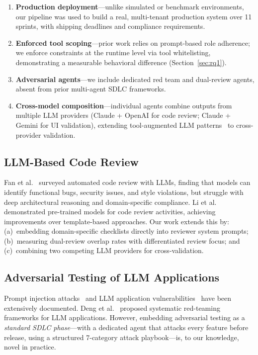 \documentclass[11pt,a4paper]{article}
\begin{document}
\begin{enumerate}
    \item \textbf{Production deployment}---unlike simulated or benchmark environments, our pipeline was used to build a real, multi-tenant production system over 11 sprints, with shipping deadlines and compliance requirements.
    \item \textbf{Enforced tool scoping}---prior work relies on prompt-based role adherence; we enforce constraints at the runtime level via tool whitelisting, demonstrating a measurable behavioral difference (Section~\ref{sec:rq1}).
    \item \textbf{Adversarial agents}---we include dedicated red team and dual-review agents, absent from prior multi-agent SDLC frameworks.
    \item \textbf{Cross-model composition}---individual agents combine outputs from multiple LLM providers (Claude + OpenAI for code review; Claude + Gemini for UI validation), extending tool-augmented LLM patterns~\cite{schick2023} to cross-provider validation.
\end{enumerate}

\subsection{LLM-Based Code Review}

Fan et al.~\cite{lu2023} surveyed automated code review with LLMs, finding that models can identify functional bugs, security issues, and style violations, but struggle with deep architectural reasoning and domain-specific compliance. Li et al.~\cite{li2022} demonstrated pre-trained models for code review activities, achieving improvements over template-based approaches. Our work extends this by: (a)~embedding domain-specific checklists directly into reviewer system prompts; (b)~measuring dual-review overlap rates with differentiated review focus; and (c)~combining two competing LLM providers for cross-validation.

\subsection{Adversarial Testing of LLM Applications}

Prompt injection attacks~\cite{perez2022, greshake2023} and LLM application vulnerabilities~\cite{owasp2025} have been extensively documented. Deng et al.~\cite{deng2024} proposed systematic red-teaming frameworks for LLM applications. However, embedding adversarial testing as a \textit{standard SDLC phase}---with a dedicated agent that attacks every feature before release, using a structured 7-category attack playbook---is, to our knowledge, novel in practice.
\end{document}
